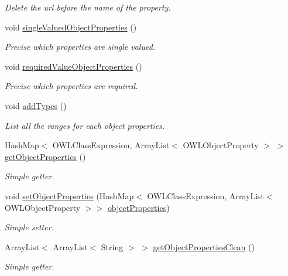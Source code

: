 \begin{DoxyCompactItemize}
\begin{DoxyCompactList}\small\item\em Delete the url before the name of the property. \end{DoxyCompactList}\item 
void \hyperlink{class_ontology_1_1_object_property_a3702e401dd6bda37cbdc5b47ec920d97}{singleValuedObjectProperties} ()
\begin{DoxyCompactList}\small\item\em Precise which properties are single valued. \end{DoxyCompactList}\item 
void \hyperlink{class_ontology_1_1_object_property_af41f2735c1ae3439a2b376a5f15dc2bb}{requiredValueObjectProperties} ()
\begin{DoxyCompactList}\small\item\em Precise which properties are required. \end{DoxyCompactList}\item 
void \hyperlink{class_ontology_1_1_object_property_a350adfd0db702a93b9bd34f8a1fb7191}{addTypes} ()
\begin{DoxyCompactList}\small\item\em List all the ranges for each object properties. \end{DoxyCompactList}\item 
HashMap$<$ OWLClassExpression, ArrayList$<$ OWLObjectProperty $>$ $>$ \hyperlink{class_ontology_1_1_object_property_aa583fe754c2ae3404cb76908b9668f99}{getObjectProperties} ()
\begin{DoxyCompactList}\small\item\em Simple getter. \end{DoxyCompactList}\item 
void \hyperlink{class_ontology_1_1_object_property_aefe14841afb0de33eb77f22a2419dd7a}{setObjectProperties} (HashMap$<$ OWLClassExpression, ArrayList$<$ OWLObjectProperty $>$$>$ \hyperlink{class_ontology_1_1_object_property_a887a6b686410445bba4c74fa0b650168}{objectProperties})
\begin{DoxyCompactList}\small\item\em Simple setter. \end{DoxyCompactList}\item 
ArrayList$<$ ArrayList$<$ String $>$ $>$ \hyperlink{class_ontology_1_1_object_property_a13b3fc665acd7a791d690f5c0e54ba42}{getObjectPropertiesClean} ()
\begin{DoxyCompactList}\small\item\em Simple getter. \end{DoxyCompactList}\item 
$$
\end{DoxyCompactItemize}
